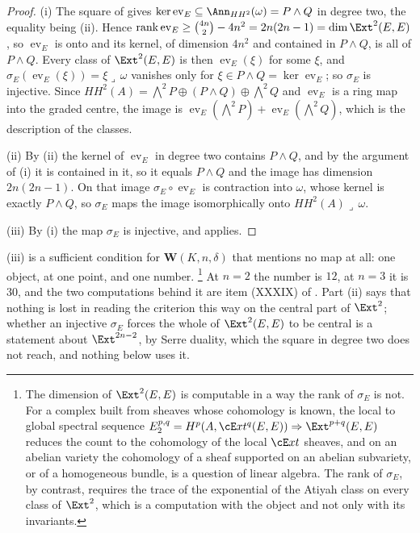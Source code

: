 \begin{proof}
(i) The square of  gives $\ker\operatorname{ev}_{E}
\subseteq\Ann_{HH^{2}}(\omega)=P\wedge Q$ in degree two, the equality being
(ii). Hence $\operatorname{rank}\operatorname{ev}_{E}
\ge\binom{4n}{2}-4n^{2}=2n(2n-1)=\dim\Ext^{2}(E,E)$, so
$\operatorname{ev}_{E}$ is onto and its kernel, of dimension $4n^{2}$ and
contained in $P\wedge Q$, is all of $P\wedge Q$. Every class of
$\Ext^{2}(E,E)$ is then $\operatorname{ev}_{E}(\xi)$ for some $\xi$, and
$\sigma_{E}(\operatorname{ev}_{E}(\xi))=\xi\lrcorner\,\omega$ vanishes only for
$\xi\in P\wedge Q=\ker\operatorname{ev}_{E}$; so $\sigma_{E}$ is injective.
Since $HH^{2}(A)=\bigwedge^{2}P\oplus(P\wedge Q)\oplus\bigwedge^{2}Q$ and
$\operatorname{ev}_{E}$ is a ring map into the graded centre, the image is
$\operatorname{ev}_{E}(\bigwedge^{2}P)+\operatorname{ev}_{E}(\bigwedge^{2}Q)$,
which is the description of the classes.

(ii) By (ii) the kernel of $\operatorname{ev}_{E}$ in
degree two contains $P\wedge Q$, and by the argument of (i) it is contained in
it, so it equals $P\wedge Q$ and the image has dimension $2n(2n-1)$. On that
image $\sigma_{E}\circ\operatorname{ev}_{E}$ is contraction into $\omega$,
whose kernel is exactly $P\wedge Q$, so $\sigma_{E}$ maps the image
isomorphically onto $HH^{2}(A)\lrcorner\,\omega$.

(iii) By (i) the map $\sigma_{E}$ is injective, and 
applies.
\end{proof}

(iii) is a sufficient condition for
$\mathbf{W}(K,n,\delta)$ that mentions no map at all: one object, at one
point, and one number.%
\footnote{The dimension of $\Ext^{2}(E,E)$ is computable in a way the rank of
$\sigma_{E}$ is not. For a complex built from sheaves whose cohomology is
known, the local to global spectral sequence
$E_{2}^{p,q}=H^{p}(A,\cE xt^{q}(E,E))\Rightarrow\Ext^{p+q}(E,E)$ reduces the
count to the cohomology of the local $\cE xt$ sheaves, and on an abelian
variety the cohomology of a sheaf supported on an abelian subvariety, or of a
homogeneous bundle, is a question of linear algebra. The rank of $\sigma_{E}$,
by contrast, requires the trace of the exponential of the Atiyah class on
every class of $\Ext^{2}$, which is a computation with the object and not only
with its invariants.}
At $n=2$ the number is $12$, at $n=3$ it is $30$, and the two computations
behind it are item (XXXIX) of . Part (ii) says that
nothing is lost in reading the criterion this way on the central part of
$\Ext^{2}$; whether an injective $\sigma_{E}$ forces the whole of
$\Ext^{2}(E,E)$ to be central is a statement about $\Ext^{2n-2}$, by Serre
duality, which the square in degree two does not reach, and nothing below
uses it.

